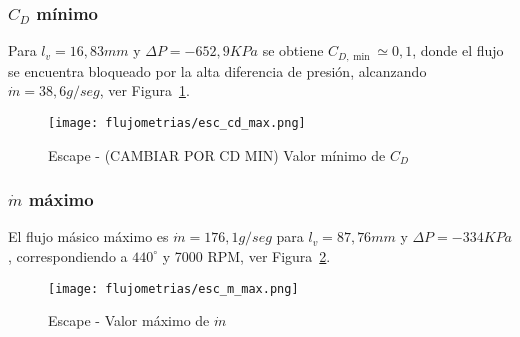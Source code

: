 \subsubsection{$C_{D}$ mínimo}
%
Para $l_{v}=16,83 mm$ y $\Delta P=-652,9 KPa$ se obtiene $C_{D, \min}\simeq 0,1$,
donde el flujo se encuentra bloqueado por la alta diferencia de presión,
alcanzando $\dot{m}=38,6 g/seg$, ver Figura~\ref{fig:esc_cd_min}.

\begin{figure}[h]
    \centering
    \texttt{[image: flujometrias/esc\_cd\_max.png]}
    \caption{Escape - (CAMBIAR POR CD MIN) Valor mínimo de $C_{D}$}\label{fig:esc_cd_min}
\end{figure}

\subsubsection{$\dot{m}$ máximo}
%
El flujo másico máximo es $\dot{m}=176,1 g/seg$ para $l_{v}=87,76 mm$ y
$\Delta P=-334 KPa$, correspondiendo a $440^{\circ}$ y 7000 RPM,
ver Figura~\ref{fig:esc_m_max}.

\begin{figure}[h]
    \centering
    \texttt{[image: flujometrias/esc\_m\_max.png]}
    \caption{Escape - Valor máximo de $\dot{m}$}\label{fig:esc_m_max}
\end{figure}
